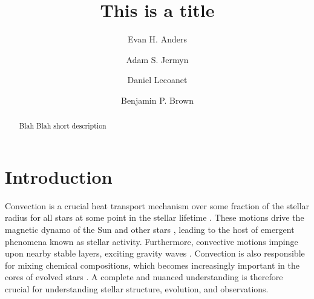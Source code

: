 \documentclass{aastex631}
\begin{document}
\title{This is a title}
\author[0000-0002-3433-4733]{Evan H. Anders}
\author[0000-0001-5048-9973]{Adam S. Jermyn}
\author[0000-0002-7635-9728]{Daniel Lecoanet}
\author[0000-0001-8935-219X]{Benjamin P. Brown}


\begin{abstract}
Blah Blah short description
\end{abstract}



\section{Introduction}
\label{sec:introduction}
Convection is a crucial heat transport mechanism over some fraction of the stellar radius for all stars at some point in the stellar lifetime \citep{woosley_etal_2002, hansen_etal_2004, christensen-dalsgaard_2021}.
These motions drive the magnetic dynamo of the Sun and other stars \citep{brun_browning_2017}, leading to the host of emergent phenomena known as stellar activity.
Furthermore, convective motions impinge upon nearby stable layers, exciting gravity waves \citep{aerts2010}.
Convection is also responsible for mixing chemical compositions, which becomes increasingly important in the cores of evolved stars \citep{salaris_cassisi_2017}.
A complete and nuanced understanding is therefore crucial for understanding stellar structure, evolution, and observations.
\end{document}
